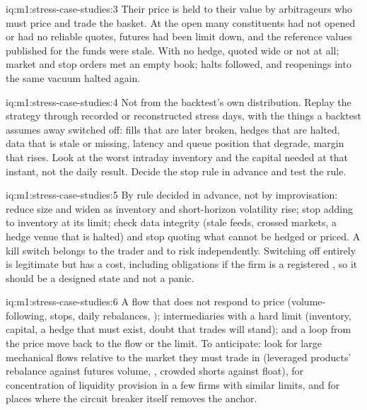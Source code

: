 \begin{solution}{iq:m1:stress-case-studies:3}
Their price is held to their value by arbitrageurs who must price and trade
the basket. At the open many constituents had not opened or had no reliable
quotes, futures had been limit down, and the reference values published for
the funds were stale. With no hedge,  quoted wide or not at
all; market and stop orders met an empty book; halts followed, and
reopenings into the same vacuum halted again.
\end{solution}

\begin{solution}{iq:m1:stress-case-studies:4}
Not from the backtest's own distribution. Replay the strategy through
recorded or reconstructed stress days, with the things a backtest assumes
away switched off: fills that are later broken, hedges that are halted, data
that is stale or missing, latency and queue position that degrade, margin
that rises. Look at the worst intraday inventory and the capital needed at
that instant, not the daily result. Decide the stop rule in advance and test
the rule.
\end{solution}

\begin{solution}{iq:m1:stress-case-studies:5}
By rule decided in advance, not by improvisation: reduce size and widen as
inventory and short-horizon volatility rise; stop adding to inventory at its
limit; check data integrity (stale feeds, crossed markets, a hedge venue that
is halted) and stop quoting what cannot be hedged or priced. A kill switch
belongs to the trader and to risk independently. Switching off entirely is
legitimate but has a cost, including obligations if the firm is a registered
, so it should be a designed state and not a panic.
\end{solution}

\begin{solution}{iq:m1:stress-case-studies:6}
A flow that does not respond to price (volume-following, stops, daily
rebalances, ); intermediaries with a hard limit (inventory,
capital, a hedge that must exist, doubt that trades will stand); and a loop
from the price move back to the flow or the limit. To anticipate: look for
large mechanical flows relative to the market they must trade in (leveraged
products' rebalance against futures volume, , crowded shorts
against float), for concentration of liquidity provision in a few firms with
similar limits, and for places where the circuit breaker itself removes the
anchor.
\end{solution}
